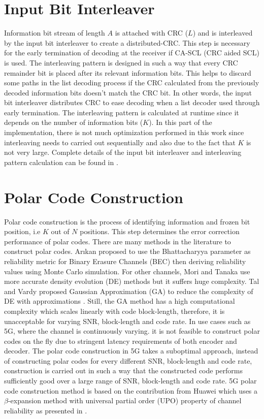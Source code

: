 \section{Input Bit Interleaver}
Information bit stream of length $A$ is attached with CRC ($L$) and is interleaved by the input bit interleaver to create a distributed-CRC. This step is necessary for the early termination of decoding at the receiver if CA-SCL (CRC aided SCL) is used. The interleaving pattern is designed in such a way that every CRC remainder bit is placed after its relevant information bits. This helps to discard some paths in the list decoding process if the CRC calculated from the previously decoded information bits doesn't match the CRC bit. In other words, the input bit interleaver distributes CRC to ease decoding when a list decoder used through early termination. The interleaving pattern is calculated at runtime since it depends on the number of information bits ($K$). In this part of the implementation, there is not much optimization performed in this work since interleaving needs to carried out sequentially and also due to the fact that $K$ is not very large. Complete details of the input bit interleaver and interleaving pattern calculation can be found in \cite{3gpp.38.212}.

\section{Polar Code Construction}
Polar code construction is the process of identifying information and frozen bit position, i.e $K$ out of $N$ positions. This step determines the error correction performance of polar codes. There are many methods in the literature to construct polar codes. Ar\i kan \cite{Arikan} proposed to use the Bhattacharyya parameter as reliability metric for Binary Erasure Channels (BEC) then deriving reliability values using Monte Carlo simulation. For other channels, Mori and Tanaka \cite{MoriTanakaDE} use more accurate density evolution (DE) methods but it suffers huge complexity. Tal and Vardy proposed Gaussian Approximation (GA) to reduce the complexity of DE with approximations \cite{TalVardyGA}. Still, the GA method has a high computational complexity which scales linearly with code block-length, therefore, it is unacceptable for varying SNR, block-length and code rate. In use cases such as 5G, where the channel is continuously varying. it is not feasible to construct polar codes on the fly due to stringent latency requirements of both encoder and decoder. The polar code construction in 5G takes a suboptimal approach, instead of constructing polar codes for every different SNR, block-length and code rate, construction is carried out in such a way that the constructed code performs sufficiently good over a large range of SNR, block-length and code rate. 5G polar code construction method is based on the contribution from Huawei which uses a $\beta$-expansion method with universal partial order (UPO) property of channel reliability as presented in \cite{betaExpansion}. \newline

